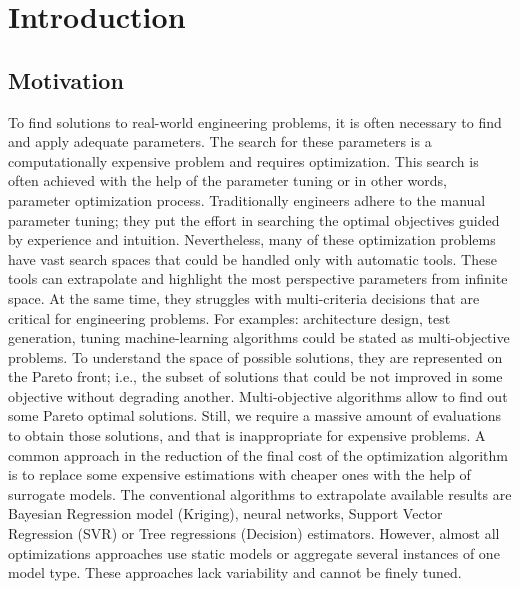 \chapter{Introduction}\label{sec:intro}

\section{Motivation}
    To find solutions to real-world engineering problems, it is often necessary to find and apply adequate parameters. The search for these parameters is a computationally expensive problem and requires optimization. This search is often achieved with the help of the parameter tuning or in other words, parameter optimization process.
    Traditionally engineers adhere to the manual parameter tuning; they put the effort in searching the optimal objectives guided by experience and intuition. Nevertheless, many of these optimization problems have vast search spaces that could be handled only with automatic tools. These tools can extrapolate and highlight the most perspective parameters from infinite space. At the same time, they struggles with multi-criteria decisions that are critical for engineering problems. For examples: architecture design, test generation, tuning machine-learning algorithms could be stated as multi-objective problems. To understand the space of possible solutions, they are represented on the Pareto front; i.e., the subset of solutions that could be not improved in some objective without degrading another.
    Multi-objective algorithms allow to find out some Pareto optimal solutions. Still, we require a massive amount of evaluations to obtain those solutions, and that is inappropriate for expensive problems. A common approach in the reduction of the final cost of the optimization algorithm is to replace some expensive estimations with cheaper ones with the help of surrogate models. The conventional algorithms to extrapolate available results are Bayesian Regression model (Kriging), neural networks, Support Vector Regression (SVR) or Tree regressions (Decision) estimators. However, almost all optimizations approaches use static models or aggregate several instances of one model type. These approaches lack variability and cannot be finely tuned.

